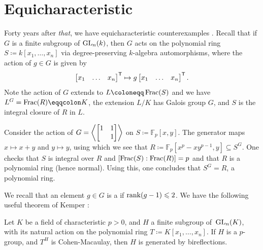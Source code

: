 \documentclass[12pt]{article}
\begin{document}
\section{Equicharacteristic}
	
	Forty years after \emph{that}, we have equicharacteristic counterexamples \cite[Theorem~2.2]{MSS:Abelian}. 
	Recall that if $G$ is a finite subgroup of $\operatorname{GL}_{n}(k)$, then $G$ acts on the polynomial ring $S \coloneqq k[x_1,\dots,x_n]$ via degree-preserving $k$-algebra automorphisms, where the action of $g \in G$ is given by
	\begin{equation*}
		\begin{bmatrix} x_1 & \hdots & x_n \end{bmatrix}^{\mathsf{T}}
		\mapsto
		g \begin{bmatrix} x_1 & \hdots & x_n \end{bmatrix}^{\mathsf{T}}.
	\end{equation*}
	Note the action of $G$ extends to $L \coloneqq \Frac(S)$ and we have 
	$L^{G} = \Frac(R) \eqqcolon K$, 
	the extension $L/K$ has Galois group $G$,
	and $S$ is the integral closure of $R$ in $L$. 

	\begin{ex} \label{ex:poly}
		Consider the action of $G = \left\langle \begin{bmatrix} 1 & 1 \\  & 1 \end{bmatrix} \right\rangle$ on $S \coloneqq \mathbb{F}_{p}[x, y]$. 
		The generator maps $x \mapsto x+y$ and $y \mapsto y$, using which we see that
		$R \coloneqq \mathbb{F}_{p}[x^p - x y^{p-1}, y] \subseteq S^{G}$. 
		One checks that $S$ is integral over $R$ and $[\operatorname{Frac}(S) : \operatorname{Frac}(R)]=p$ and that $R$ is a polynomial ring (hence normal). 
		Using this, one concludes that $S^G = R$, a polynomial ring. 
	\end{ex}

	We recall that an element $g \in G$ is a  if $\operatorname{rank}(g-1) \leqslant 2$. 
	We have the following useful theorem of Kemper \cite[Theorem~2.1]{Kemper:CM}:
	\begin{thm}
		Let $K$ be a field of characteristic $p>0$, and $H$ a finite subgroup of~$\operatorname{GL}_n(K)$, with its natural action on the polynomial ring 
		$T \coloneqq K[x_1,\dots,x_n]$. 
		If $H$ is a $p$-group, and $T^H$ is Cohen-Macaulay, then $H$ is generated by bireflections.
	\end{thm}	
\end{document}
